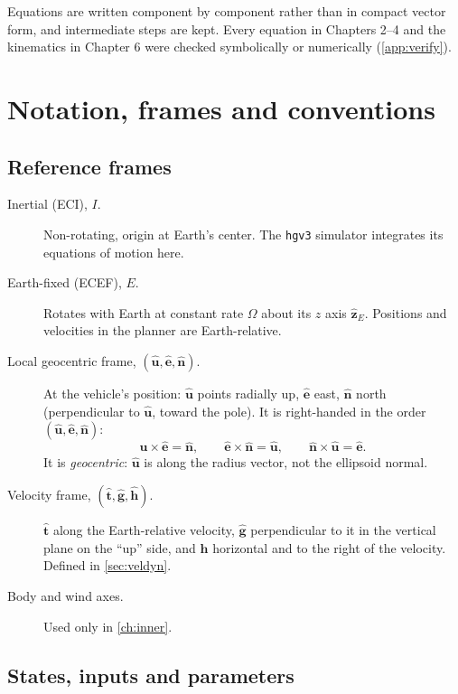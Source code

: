 \documentclass[11pt]{report}
\numberwithin{equation}{chapter}
\newcommand{\uh}{\hat{\mathbf u}}
\newcommand{\eh}{\hat{\mathbf e}}
\newcommand{\nh}{\hat{\mathbf n}}
\newcommand{\tth}{\hat{\mathbf t}}
\newcommand{\gh}{\hat{\mathbf g}}
\newcommand{\hh}{\hat{\mathbf h}}
\newcommand{\zh}{\hat{\mathbf z}_E}
\newcommand{\code}[1]{\texttt{#1}}
\begin{document}
Equations are written component by component rather than in compact vector form, and
intermediate steps are kept. Every equation in Chapters 2--4 and the kinematics in
Chapter 6 were checked symbolically or numerically (\cref{app:verify}).

\chapter{Notation, frames and conventions}\label{ch:notation}

\section{Reference frames}

\begin{description}
\item[Inertial (ECI), $I$.] Non-rotating, origin at Earth's center. The \code{hgv3}
  simulator integrates its equations of motion here.
\item[Earth-fixed (ECEF), $E$.] Rotates with Earth at constant rate $\Omega$ about its
  $z$ axis $\zh$. Positions and velocities in the planner are Earth-relative.
\item[Local geocentric frame, $(\uh,\eh,\nh)$.] At the vehicle's position: $\uh$ points
  radially up, $\eh$ east, $\nh$ north (perpendicular to $\uh$, toward the pole). It is
  right-handed in the order $(\uh,\eh,\nh)$:
  \[
    \uh\times\eh=\nh,\qquad \eh\times\nh=\uh,\qquad \nh\times\uh=\eh .
  \]
  It is \emph{geocentric}: $\uh$ is along the radius vector, not the ellipsoid normal.
\item[Velocity frame, $(\tth,\gh,\hh)$.] $\tth$ along the Earth-relative velocity,
  $\gh$ perpendicular to it in the vertical plane on the ``up'' side, and $\hh$
  horizontal and to the right of the velocity. Defined in \cref{sec:veldyn}.
\item[Body and wind axes.] Used only in \cref{ch:inner}.
\end{description}

\section{States, inputs and parameters}
\end{document}

